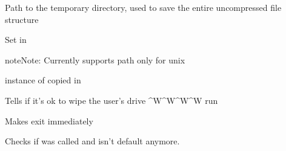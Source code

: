 \documentclass[letterpaper,10pt,english]{sphinxmanual}
\begin{document}

\begin{fulllineitems}
\label{epub:path_tmp__boost::filesystem::path}
Path to the temporary directory, used to save the entire uncompressed file structure

Set in {\hyperref[epub:mobi2epub::mobi2epub__mobi2epubR]{}}

\begin{notice}{note}{Note:}
Currently supports path only for unix
\end{notice}

\end{fulllineitems}


\begin{fulllineitems}
\label{epub:m__mobi::mobireader}
instance of {\hyperref[mobireader:mobi::mobireader]{}} copied in {\hyperref[epub:mobi2epub::mobi2epub__mobi2epubR]{}}

\end{fulllineitems}


\begin{fulllineitems}
\label{epub:safe__mutable-b}
Tells if it's ok to wipe the user's drive \textasciicircum{}W\textasciicircum{}W\textasciicircum{}W\textasciicircum{}W run {\hyperref[epub:mobi2epub::directory_structureC]{}}

\end{fulllineitems}


\begin{fulllineitems}
\label{epub:no_cleanup__mutable-b}
Makes {\hyperref[epub:mobi2epub::cleanupC]{}} exit immediately

\end{fulllineitems}


\begin{fulllineitems}
\label{epub:vanilla_out__mutable-b}
Checks if {\hyperref[epub:mobi2epub::set_out__ssR]{}} was called and {\hyperref[epub:path_out__boost::filesystem::path]{}}
isn't default anymore.

\end{fulllineitems}
\end{document}
